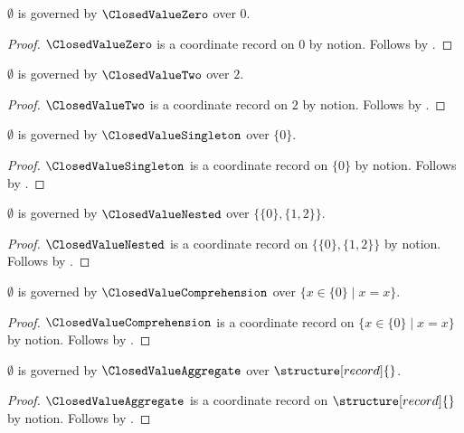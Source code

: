 

\begin{proposition}\label{closed_value_imported_zero}
    $\emptyset$ is governed by $\ClosedValueZero$ over $0$.
\end{proposition}
\begin{proof}
    $\ClosedValueZero$ is a coordinate record on $0$ by notion.
    Follows by .
\end{proof}

\begin{proposition}\label{closed_value_imported_two}
    $\emptyset$ is governed by $\ClosedValueTwo$ over $2$.
\end{proposition}
\begin{proof}
    $\ClosedValueTwo$ is a coordinate record on $2$ by notion.
    Follows by .
\end{proof}

\begin{proposition}\label{closed_value_imported_singleton}
    $\emptyset$ is governed by $\ClosedValueSingleton$ over $\{0\}$.
\end{proposition}
\begin{proof}
    $\ClosedValueSingleton$ is a coordinate record on $\{0\}$ by notion.
    Follows by .
\end{proof}

\begin{proposition}\label{closed_value_imported_nested}
    $\emptyset$ is governed by $\ClosedValueNested$ over $\{\{0\},\{1,2\}\}$.
\end{proposition}
\begin{proof}
    $\ClosedValueNested$ is a coordinate record on $\{\{0\},\{1,2\}\}$ by notion.
    Follows by .
\end{proof}

\begin{proposition}\label{closed_value_imported_comprehension}
    $\emptyset$ is governed by $\ClosedValueComprehension$ over $\{x\in\{0\}\mid x=x\}$.
\end{proposition}
\begin{proof}
    $\ClosedValueComprehension$ is a coordinate record on $\{x\in\{0\}\mid x=x\}$ by notion.
    Follows by .
\end{proof}

\begin{proposition}\label{closed_value_imported_aggregate}
    $\emptyset$ is governed by $\ClosedValueAggregate$ over $\structure[record]{}$.
\end{proposition}
\begin{proof}
    $\ClosedValueAggregate$ is a coordinate record on $\structure[record]{}$ by notion.
    Follows by .
\end{proof}

